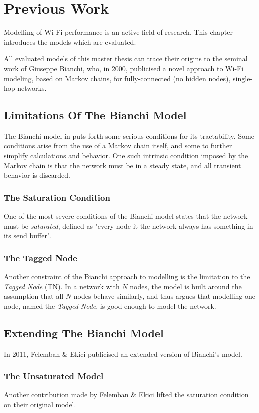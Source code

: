 \chapter{Previous Work}

Modelling of Wi-Fi performance is an active field of research. This chapter introduces the models which are evaluated.

All evaluated models of this master thesis can trace their origins to the seminal work of Giuseppe Bianchi, who, in 2000, publicised a novel approach to Wi-Fi modeling, based on Markov chains\cite{bianchi}, for fully-connected (no hidden nodes), single-hop networks.

\section{Limitations Of The Bianchi Model}
The Bianchi model in \cite{bianchi} puts forth some serious conditions for its tractability. Some conditions arise from the use of a Markov chain itself, and some to further simplify calculations and behavior. One such intrinsic condition imposed by the Markov chain is that the network must be in a steady state, and all transient behavior is discarded.

\subsection{The Saturation Condition}

One of the most severe conditions of the Bianchi model states that the network must be \emph{saturated}, defined as "every node it the network always has something in its send buffer".

\subsection{The Tagged Node}

Another constraint of the Bianchi approach to modelling is the limitation to the \emph{Tagged Node} (TN). In a network with $N$ nodes, the model is built around the assumption that all $N$ nodes behave similarly, and thus argues that modelling one node, named the \emph{Tagged Node}, is good enough to model the network.

\section{Extending The Bianchi Model}

In 2011, Felemban \& Ekici publicised an extended version of Bianchi's model.

\subsection{The Unsaturated Model}

Another contribution made by Felemban \& Ekici lifted the saturation condition on their original model.